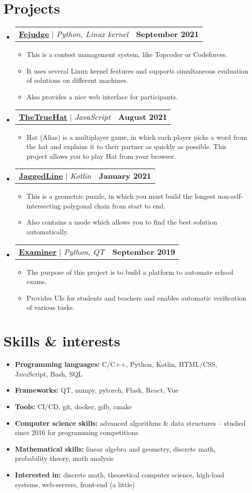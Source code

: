 \documentclass[letterpaper,11pt]{article}
\makeatletter
\newcommand{\resumeProjectHeading}[2]{
    \item
    \begin{tabular*}{1.0\textwidth}{l@{\extracolsep{\fill}}r}
        \small #1 & \textbf{\small #2} \\
    \end{tabular*}\vspace{-5pt}
}
\newcommand{\resumeSubHeadingListStart}{\begin{itemize}[leftmargin=0.0in, label={}]}
\newcommand{\resumeSubHeadingListEnd}{\end{itemize}}
\newcommand{\resumeItemListStart}{\begin{itemize}}
\newcommand{\resumeItemListEnd}{\end{itemize}\vspace{-8pt}}
\newcommand{\resumeItem}[1]{\item\small{{#1 \vspace{-2pt}}}}
\newcommand{\resumeSubItem}[1]{\resumeItem{#1}\vspace{-4pt}}
\makeatother
\begin{document}
\section{Projects}
    \resumeSubHeadingListStart

        \resumeProjectHeading
        {\textbf{\href{https://github.com/m20-sch57/Fejudge}{\underline{Fejudge}}} $|$ \emph{Python, Linux kernel}}{September 2021}
        \resumeItemListStart
            \resumeItem{This is a contest management system, like Topcoder or Codeforces.}
            \resumeItem{It uses several Linux kernel features and supports simultaneous evaluation of solutions on different machines.}
            \resumeItem{Also provides a nice web interface for participants.}
        \resumeItemListEnd

        \resumeProjectHeading
        {\textbf{\href{https://github.com/m20-sch57/thetruehat}{\underline{TheTrueHat}}} $|$ \emph{JavaScript}}{August 2021}
        \resumeItemListStart
            \resumeItem{Hat (Alias) is a multiplayer game, in which each player picks a word from the hat and explains it to their partner as quickly as possible. This project allows you to play Hat from your browser.}
        \resumeItemListEnd 

        \resumeProjectHeading
        {\textbf{\href{https://github.com/JaggedLine/KotlinLine}{\underline{JaggedLine}}} $|$ \emph{Kotlin}}{January 2021}
        \resumeItemListStart
            \resumeItem{This is a geometric puzzle, in which you must build the longest non-self-intersecting polygonal chain from start to end.}
            \resumeItem{Also contains a mode which allows you to find the best solution automatically.}
        \resumeItemListEnd

        \resumeProjectHeading
        {\textbf{\href{https://github.com/m20-sch57/exam-system}{\underline{Examiner}}} $|$ \emph{Python, QT}}{September 2019}
        \resumeItemListStart
            \resumeItem{The purpose of this project is to build a platform to automate school exams.}
            \resumeItem{Provides UIs for students and teachers and enables automatic verification of various tasks.}
        \resumeItemListEnd

    \resumeSubHeadingListEnd


\section{Skills \& interests}
    \resumeItemListStart
        \resumeSubItem{\textbf{Programming languages: }{C/C++, Python, Kotlin, HTML/CSS, JavaScript, Bash, SQL}}
        \resumeSubItem{\textbf{Frameworks: }{QT, numpy, pytorch, Flask, React, Vue}}
        \resumeSubItem{\textbf{Tools: }{CI/CD, git, docker, gdb, cmake}}
        \resumeSubItem{\textbf{Computer science skills: }{advanced algorithms \& data structures -- studied since 2016 for programming competitions}}
        \resumeSubItem{\textbf{Mathematical skills: }{linear algebra and geometry, discrete math, probability theory, math analysis}}
        \resumeSubItem{\textbf{Interested in: }{discrete math, theoretical computer science, high-load systems, web-servers, front-end (a little)}}
    \resumeItemListEnd
\end{document}
